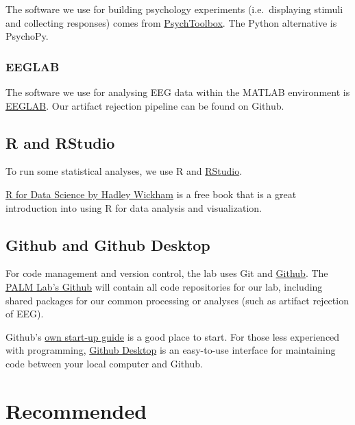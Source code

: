 \documentclass[
]{book}
\begin{document}
The software we use for building psychology experiments (i.e.~displaying stimuli and collecting responses) comes from \href{http://psychtoolbox.org/}{PsychToolbox}. The Python alternative is PsychoPy.

\hypertarget{eeglab}{%
\subsubsection*{EEGLAB}\label{eeglab}}

The software we use for analysing EEG data within the MATLAB environment is \href{https://sccn.ucsd.edu/eeglab/index.php}{EEGLAB}. Our artifact rejection pipeline can be found on Github.

\hypertarget{r-and-rstudio}{%
\subsection*{R and RStudio}\label{r-and-rstudio}}

To run some statistical analyses, we use R and \href{https://posit.co/download/rstudio-desktop/}{RStudio}.

\href{https://r4ds.hadley.nz/}{R for Data Science by Hadley Wickham} is a free book that is a great introduction into using R for data analysis and visualization.

\hypertarget{github-and-github-desktop}{%
\subsection*{Github and Github Desktop}\label{github-and-github-desktop}}

For code management and version control, the lab uses Git and \href{https://github.com}{Github}. The \href{https://github.com/PALM-Lab}{PALM Lab's Github} will contain all code repositories for our lab, including shared packages for our common processing or analyses (such as artifact rejection of EEG).

Github's \href{https://docs.github.com/en/get-started/quickstart/hello-world}{own start-up guide} is a good place to start. For those less experienced with programming, \href{https://desktop.github.com/}{Github Desktop} is an easy-to-use interface for maintaining code between your local computer and Github.

\hypertarget{recommended}{%
\section{Recommended}\label{recommended}}
\end{document}
